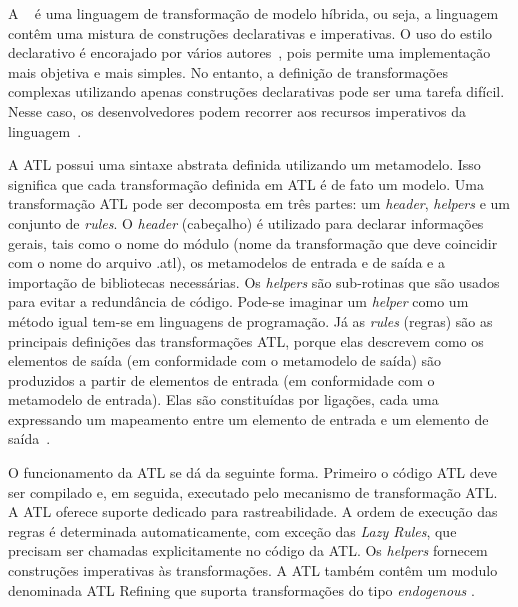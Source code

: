 A ~\cite{ATL_eclipse} é uma linguagem de transformação de modelo híbrida, ou seja, a linguagem contêm uma mistura de construções declarativas e imperativas. O uso do estilo declarativo é encorajado por vários autores~\cite{Allilaire_06, Jouault_2005, Jouault_2008}, pois permite uma implementação mais objetiva e mais simples. No entanto, a definição de transformações complexas utilizando apenas construções declarativas pode ser uma tarefa difícil. Nesse caso, os desenvolvedores podem recorrer aos recursos imperativos da linguagem~\cite{Allilaire_06}.

A ATL possui uma sintaxe abstrata definida utilizando um metamodelo. Isso significa que cada transformação definida em ATL é de fato um modelo. Uma transformação ATL pode ser decomposta em três partes: um \textit{header}, \textit{helpers} e um conjunto de \textit{rules}. O \textit{header} (cabeçalho) é utilizado para declarar informações gerais, tais como o nome do módulo (nome da transformação que deve coincidir com o nome do arquivo .atl), os metamodelos de entrada e de saída  e a importação de bibliotecas necessárias. Os \textit{helpers} são sub-rotinas que são usados para evitar a redundância de código. Pode-se imaginar um \textit{helper} como um método igual tem-se em linguagens de programação. Já as \textit{rules} (regras) são as principais definições das transformações ATL, porque elas descrevem como os elementos de saída (em conformidade com o metamodelo de saída) são produzidos a partir de elementos de entrada (em conformidade com o metamodelo de entrada). Elas são constituídas por ligações, cada uma expressando um mapeamento entre um elemento de entrada e um elemento de saída~\cite{ATL_eclipse}.

O funcionamento da ATL se dá da seguinte forma. Primeiro o código ATL deve ser compilado e, em seguida, executado pelo mecanismo de transformação ATL. A ATL oferece suporte dedicado para rastreabilidade. A ordem de execução das regras é determinada automaticamente, com exceção das \textit{Lazy Rules}, que precisam ser chamadas explicitamente no código da ATL. Os \textit{helpers} fornecem construções imperativas às transformações. A ATL também contêm um modulo denominada ATL Refining que suporta transformações do tipo \emph{endogenous} .

